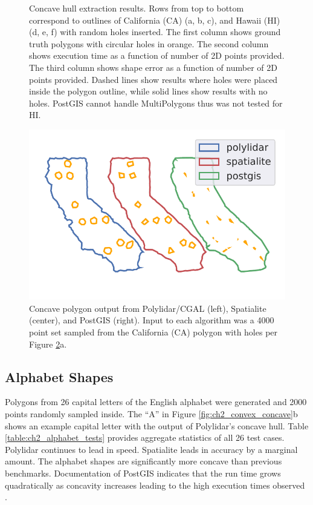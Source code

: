 \begin{figure}[ht]
\begin{subfigure}[t]{.33\linewidth}
    \caption{}
    \label{fig:ch2_hi_acc}
  \end{subfigure}
  \caption[Execution and accuracy results from state shape benchmark]{Concave hull extraction results. Rows from top to bottom correspond to outlines of California (CA) (a, b, c), and Hawaii (HI) (d, e, f) with random holes inserted. The first column shows ground truth polygons with circular holes in orange. The second column shows execution time as a function of number of 2D points provided. The third column shows shape error as a function of number of 2D points provided. Dashed lines show results where holes were placed inside the polygon outline, while solid lines show results with no holes. PostGIS cannot handle MultiPolygons thus was not tested for HI.}
  \label{fig:ch2_compare_algs_all} 
\end{figure}

\begin{figure}[!ht] 
    \centering
      \includegraphics[clip, trim=0.5cm 1.2cm 0.0cm 0.0cm, width=0.25\linewidth]{chapter_2_polylidar/imgs/ouput_ca.pdf}
  \caption[Visual comparison of different polygon extraction methods]{Concave polygon output from Polylidar/CGAL (left), Spatialite (center), and PostGIS (right).  Input to each algorithm was a 4000 point set sampled from the California (CA) polygon with holes per Figure \ref{fig:ch2_compare_algs_all}a.}
  \label{fig:ch2_ca_output} 
\end{figure}





\subsection{Alphabet Shapes}\label{sec:ch2_alphabet_shapes}

Polygons from 26 capital letters of the English alphabet were generated and 2000 points randomly sampled inside.
The ``A'' in Figure \ref{fig:ch2_convex_concave}b shows an example capital letter with the output of Polylidar's concave hull. Table \ref{table:ch2_alphabet_tests} provides aggregate statistics of all 26 test cases. Polylidar continues to lead in speed. Spatialite leads in accuracy by a marginal amount. The alphabet shapes are significantly more concave than previous benchmarks. Documentation of PostGIS indicates that the run time grows quadratically as concavity increases leading to the high execution times observed \cite{open_source_geospatial_foundation_postgis_2019}.

